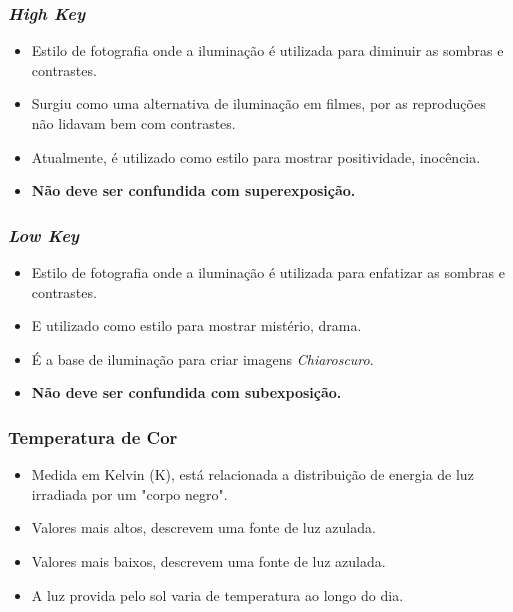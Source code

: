 
\begin{frame}
    \frametitle{\textit{High Key}}
    \begin{itemize}
      \item Estilo de fotografia onde a iluminação é utilizada para diminuir as
      sombras e contrastes.
      \item Surgiu como uma alternativa de iluminação em filmes, por as reproduções
      não lidavam bem com contrastes.
      \item Atualmente, é utilizado como estilo para mostrar positividade, inocência.
      \item \textbf{Não deve ser confundida com superexposição.}
    \end{itemize}
\end{frame}



\begin{frame}
    \frametitle{\textit{Low Key}}
    \begin{itemize}
      \item Estilo de fotografia onde a iluminação é utilizada para enfatizar as
      sombras e contrastes.
      \item E utilizado como estilo para mostrar mistério, drama.
      \item É a base de iluminação para criar imagens \textit{Chiaroscuro}.
      \item \textbf{Não deve ser confundida com subexposição.}
    \end{itemize}
\end{frame}


\begin{frame}
    \frametitle{Temperatura de Cor}
    \begin{itemize}
      \item Medida em Kelvin (K), está relacionada a distribuição de energia de luz
      irradiada por um "corpo negro".
      \item Valores mais altos, descrevem uma fonte de luz azulada.
      \item Valores mais baixos, descrevem uma fonte de luz azulada.
      \item A luz provida pelo sol varia de temperatura ao longo do dia.
    \end{itemize}
\end{frame}

